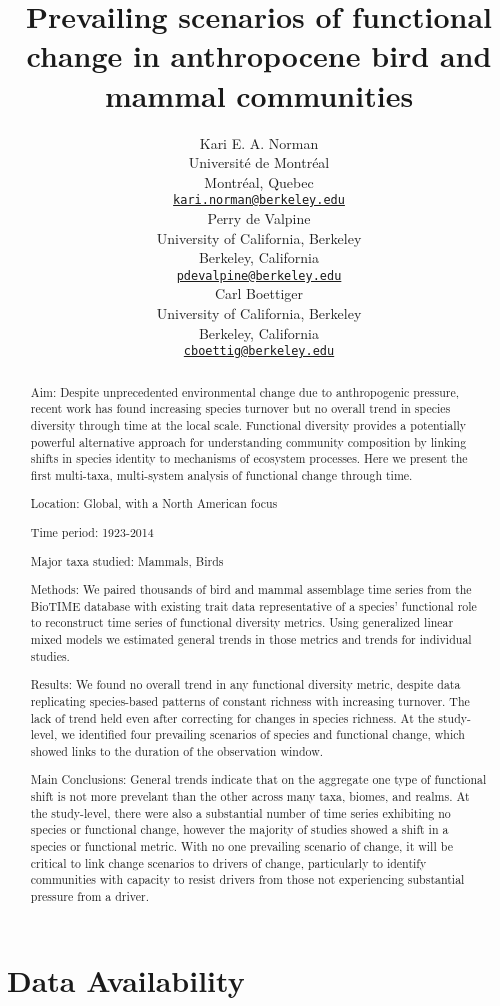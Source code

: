 \documentclass{article}
\title{Prevailing scenarios of functional change in anthropocene bird
and mammal communities}
\author{
    Kari E. A. Norman
   \\
    Université de Montréal \\
  Montréal, Quebec \\
  \texttt{\href{mailto:kari.norman@berkeley.edu}{\nolinkurl{kari.norman@berkeley.edu}}} \\
   \And
    Perry de Valpine
   \\
    University of California, Berkeley \\
  Berkeley, California \\
  \texttt{\href{mailto:pdevalpine@berkeley.edu}{\nolinkurl{pdevalpine@berkeley.edu}}} \\
   \And
    Carl Boettiger
   \\
    University of California, Berkeley \\
  Berkeley, California \\
  \texttt{\href{mailto:cboettig@berkeley.edu}{\nolinkurl{cboettig@berkeley.edu}}} \\
  }
\begin{document}
\maketitle


\begin{abstract}
Aim: Despite unprecedented environmental change due to anthropogenic
pressure, recent work has found increasing species turnover but no
overall trend in species diversity through time at the local scale.
Functional diversity provides a potentially powerful alternative
approach for understanding community composition by linking shifts in
species identity to mechanisms of ecosystem processes. Here we present
the first multi-taxa, multi-system analysis of functional change through
time.

Location: Global, with a North American focus

Time period: 1923-2014

Major taxa studied: Mammals, Birds

Methods: We paired thousands of bird and mammal assemblage time series
from the BioTIME database with existing trait data representative of a
species' functional role to reconstruct time series of functional
diversity metrics. Using generalized linear mixed models we estimated
general trends in those metrics and trends for individual studies.

Results: We found no overall trend in any functional diversity metric,
despite data replicating species-based patterns of constant richness
with increasing turnover. The lack of trend held even after correcting
for changes in species richness. At the study-level, we identified four
prevailing scenarios of species and functional change, which showed
links to the duration of the observation window.

Main Conclusions: General trends indicate that on the aggregate one type
of functional shift is not more prevelant than the other across many
taxa, biomes, and realms. At the study-level, there were also a
substantial number of time series exhibiting no species or functional
change, however the majority of studies showed a shift in a species or
functional metric. With no one prevailing scenario of change, it will be
critical to link change scenarios to drivers of change, particularly to
identify communities with capacity to resist drivers from those not
experiencing substantial pressure from a driver.
\end{abstract}


\hypertarget{data-availability}{%
\section{Data Availability}\label{data-availability}}
\end{document}
